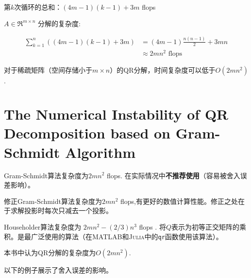 第$k$次循环的总和：$(4m-1)(k-1)+3m$ flops

$ A \in \mathfrak{R}^{m \times n} $ 分解的复杂度:

\begin{equation} \begin{aligned} \sum_{k=1}^{n}((4 m-1)(k-1)+3 m) &=(4 m-1) \frac{n(n-1)}{2}+3 m n \\ & \approx 2 m n^{2} \text { flops } \end{aligned} \end{equation}

对于稀疏矩阵（空间存储小于$m \times n$）的QR分解，时间复杂度可以低于$O(2mn^2)$. 



\section{The Numerical Instability of QR Decomposition based on Gram-Schmidt Algorithm}

Gram-Schmidt算法复杂度为$2mn^2$ flops. 在实际情况中\textbf{不推荐使用}（容易被舍入误差影响）。

修正Gram-Schmidt算法复杂度为$2mn^2$ flops,有更好的数值计算性能。修正之处在于求解投影时每次只减去一个投影。

Householder算法复杂度为 $ 2 m n^{2}-(2 / 3) n^{3} $ flops .
将$Q$表示为初等正交矩阵的乘积。是最广泛使用的算法（在\textsc{MATLAB}和\textsc{Julia}中的\verb|qr|函数使用该算法）。

本书中认为QR分解的复杂度为$O(2mn^2)$.

以下的例子展示了舍入误差的影响。

